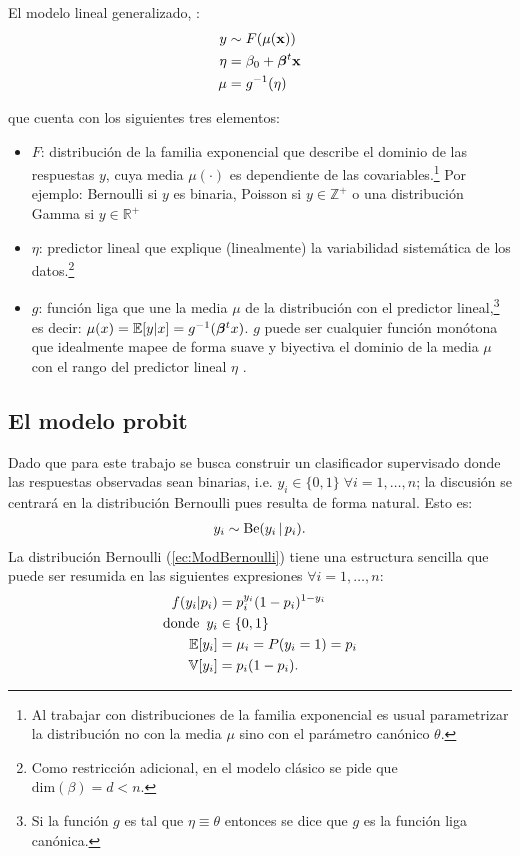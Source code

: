 \documentclass[../Main/Main.tex]{subfiles}
\begin{document}
\begin{definition} El modelo lineal generalizado, \citet{sundberg2016exponential}:
\begin{align} 
	y &\sim F(\mu(\mathbf{x})) \label{ec:GLM} \\ 
	\eta &= \beta_0 + \bm{\beta}^t\mathbf{x} \nonumber \\ 
	\mu &= g^{-1}(\eta) \nonumber
\end{align}
\end{definition}
que cuenta con los siguientes tres elementos:
\begin{itemize}[label={}]
	\item $F$: distribución de la familia exponencial que describe el dominio de las respuestas $y$, cuya media $\mu(\cdot)$ es dependiente de las covariables.\footnote{Al trabajar con distribuciones de la familia exponencial es usual parametrizar la distribución no con la media $\mu$ sino con el parámetro canónico $\theta$.} Por ejemplo: Bernoulli si $y$ es binaria, Poisson si $y \in \mathbb{Z}^+$ o una distribución Gamma si $y \in \mathbb{R}^+$
	\item $\eta$: predictor lineal que explique (linealmente) la variabilidad sistemática de los datos.\footnote{Como restricción adicional, en el modelo clásico se pide que $\text{dim}(\beta) = d < n.$}
	\item $g$: función liga que une la media $\mu$ de la distribución con el predictor lineal,\footnote{Si la función $g$ es tal que $\eta \equiv \theta$ entonces se dice que $g$ es la función liga canónica. } es decir: $\mu(x) = \mathbb{E}[y|x] = g^{-1}(\bm{\beta}^tx)$. $g$ puede ser cualquier función monótona que idealmente mapee de forma suave y biyectiva el dominio de la media $\mu$ con el rango del predictor lineal $\eta$ \autocite{hardle2004semiparametric}. 
\end{itemize}

\subsection{El modelo probit}
Dado que para este trabajo se busca construir un clasificador supervisado donde las respuestas observadas sean binarias, i.e. $y_i \in \{0,1\} \; \forall i=1,\ldots,n$; la discusión se centrará en la distribución Bernoulli pues resulta de forma natural. Esto es:
\begin{align}
	y_i \sim \text{Be}(y_i \, |\, p_i). \label{ec:ModBernoulli}
\end{align}
La distribución Bernoulli (\ref{ec:ModBernoulli}) tiene una estructura sencilla que puede ser resumida en las siguientes expresiones $\forall i = 1,\ldots,n$:  
\begin{align}
	f(y_i|p_i) &= p_i^{y_i}(1 - p_i)^{1 - y_i} \label{ec:DensidadBernoulli} \\
	\text{donde }\, y_i &\in \{0,1\}  \nonumber\\
	\mathbb{E}[y_i] &= \mu_i = P(y_i = 1) = p_i  \nonumber\\
	\mathbb{V}[y_i] &= p_i(1 - p_i) \nonumber. 
\end{align}			
\end{document}
